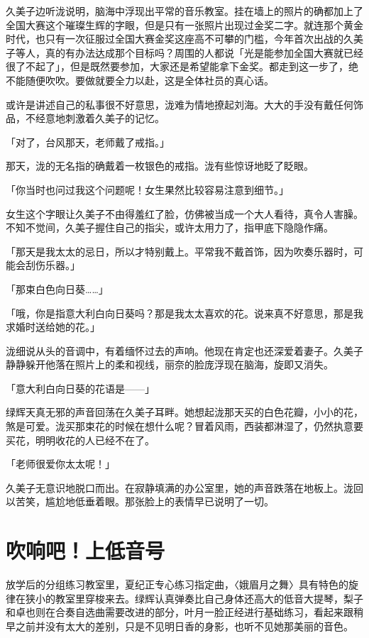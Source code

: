 \documentclass[UTF8]{ctexart}
\begin{document}
    久美子边听泷说明，脑海中浮现出平常的音乐教室。挂在墙上的照片的确都加上了全国大赛这个璀璨生辉的字眼，但是只有一张照片出现过金奖二字。就连那个黄金时代，也只有一次征服过全国大赛金奖这座高不可攀的门槛，今年首次出战的久美子等人，真的有办法达成那个目标吗？周围的人都说「光是能参加全国大赛就已经很了不起了」，但是既然要参加，大家还是希望能拿下金奖。都走到这一步了，绝不能随便吹吹。要做就要全力以赴，这是全体社员的真心话。 

    或许是讲述自己的私事很不好意思，泷难为情地撩起刘海。大大的手没有戴任何饰品，不经意地刺激着久美子的记忆。 

    「对了，台风那天，老师戴了戒指。」 

    那天，泷的无名指的确戴着一枚银色的戒指。泷有些惊讶地眨了眨眼。 

    「你当时也问过我这个问题呢！女生果然比较容易注意到细节。」 

    女生这个字眼让久美子不由得羞红了脸，仿佛被当成一个大人看待，真令人害臊。不知不觉间，久美子握住自己的指尖，或许太用力了，指甲底下隐隐作痛。 

    「那天是我太太的忌日，所以才特别戴上。平常我不戴首饰，因为吹奏乐器时，可能会刮伤乐器。」 

    「那束白色向日葵……」 

    「哦，你是指意大利白向日葵吗？那是我太太喜欢的花。说来真不好意思，那是我求婚时送给她的花。」 

    泷细说从头的音调中，有着缅怀过去的声响。他现在肯定也还深爱着妻子。久美子静静躲开他落在照片上的柔和视线，丽奈的脸庞浮现在脑海，旋即又消失。 

    「意大利白向日葵的花语是——」 

    绿辉天真无邪的声音回荡在久美子耳畔。她想起泷那天买的白色花瓣，小小的花，煞是可爱。泷买那束花的时候在想什么呢？冒着风雨，西装都淋湿了，仍然执意要买花，明明收花的人已经不在了。 

    「老师很爱你太太呢！」 

    久美子无意识地脱口而出。在寂静填满的办公室里，她的声音跌落在地板上。泷回以苦笑，尴尬地低垂着眼。那张脸上的表情早已说明了一切。 

    \section{吹响吧！上低音号}
    放学后的分组练习教室里，夏纪正专心练习指定曲，〈娥眉月之舞〉具有特色的旋律在狭小的教室里穿梭来去。绿辉认真弹奏比自己身体还高大的低音大提琴，梨子和卓也则在合奏自选曲需要改进的部分，叶月一脸正经进行基础练习，看起来跟稍早之前并没有太大的差别，只是不见明日香的身影，也听不见她那美丽的音色。 
\end{document}
